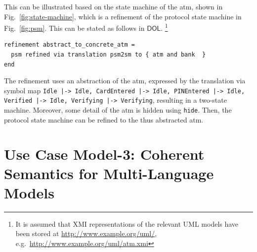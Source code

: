 \documentclass[10pt,fleqn,final]{scrreprt}
\newcommand*{\syntax}[1]{\texttt{#1}}
\newcommand*{\DOL}{\ensuremath{\mathsf{DOL}}\xspace}
\newenvironment{definitions}[0]{\medskip }{}
\newcommand{\uml}[1]{\textsf{#1}}
\begin{document}
\begin{definitions}
 This can be illustrated based on the state
machine of the \uml{atm}, shown in Fig.~\ref{fig:state-machine}, which is a  
refinement of the protocol state machine in Fig.~\ref{fig:psm}. This can be stated as follows in \DOL. 
\footnote{  It is assumed that XMI representations of the relevant UML models have been 
stored at \url{http://www.example.org/uml/},
e.g.\ \url{http://www.example.org/uml/atm.xmi} } 


\begin{lstlisting}[basicstyle=\ttfamily,language=dolText,escapechar=@,mathescape]
refinement abstract_to_concrete_atm =
  psm refined via translation psm2sm to { atm and bank  }
end
\end{lstlisting}

The refinement uses an abstraction of the \uml{atm}, expressed by the
translation via symbol map \texttt{Idle |-> Idle, CardEntered |-> Idle, PINEntered |-> Idle, Verified |-> Idle, Verifying |-> Verifying}, resulting in a two-state machine. Moreover, some detail of the \uml{atm} is hidden using
\syntax{hide}. Then, the protocol state machine can be refined to
the thus abstracted \uml{atm}.

\section{Use Case Model-3: Coherent Semantics for Multi-Language Models}
\label{model-3}


\end{definitions}
\end{document}
